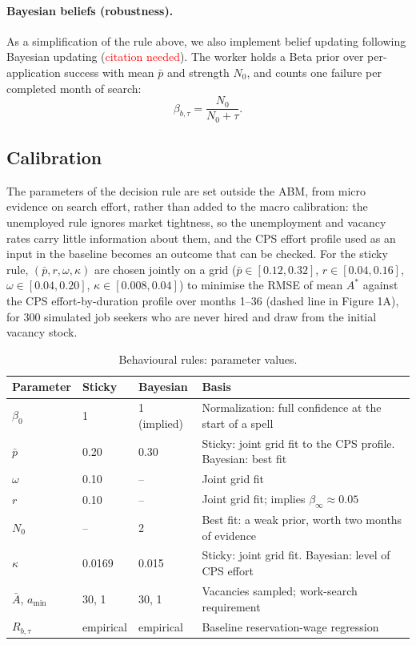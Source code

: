 \documentclass[11pt]{article}
\begin{document}
\paragraph{Bayesian beliefs (robustness).}
As a simplification of the rule above, we also implement belief updating following Bayesian updating (\textcolor{red}{citation needed}). The worker holds a Beta prior over per-application success with mean $\bar p$ and strength $N_0$, and counts one
failure per completed month of search:
\begin{equation}
\beta_{b,\tau} = \frac{N_0}{N_0 + \tau} .
\end{equation}

\subsection{Calibration}\label{sec:cps_cal}

The parameters of the decision rule are set outside the ABM, from micro evidence on search effort, rather than added
to the macro calibration: the unemployed rule ignores market tightness, so the unemployment and vacancy rates carry
little information about them, and the CPS effort profile used as an input in the baseline becomes an outcome that can
be checked. For the sticky rule, $(\bar p, r, \omega, \kappa)$ are chosen jointly on a grid
($\bar p \in [0.12, 0.32]$, $r \in [0.04, 0.16]$, $\omega \in [0.04, 0.20]$, $\kappa \in [0.008, 0.04]$) to minimise
the RMSE of mean $A^*$ against the CPS effort-by-duration profile over months 1--36 (dashed line in Figure 1A), for 300 simulated job seekers who
are never hired and draw from the initial vacancy stock. 

\begin{table}[H]
\centering
\small
\begin{tabularx}{\linewidth}{@{}lllX@{}}
\toprule
Parameter & Sticky & Bayesian & Basis \\
\midrule
$\beta_0$ & 1 & 1 (implied) & Normalization: full confidence at the start of a spell \\
$\bar p$ & 0.20 & 0.30 & Sticky: joint grid fit to the CPS profile. Bayesian: best fit \\
$\omega$ & 0.10 & -- & Joint grid fit \\
$r$ & 0.10 & -- & Joint grid fit; implies $\beta_\infty \approx 0.05$ \\
$N_0$ & -- & 2 & Best fit: a weak prior, worth two months of evidence \\
$\kappa$ & 0.0169 & 0.015 & Sticky: joint grid fit. Bayesian: level of CPS effort \\
$\bar A$, $a_{\min}$ & 30, 1 & 30, 1 & Vacancies sampled; work-search requirement \\
$R_{b,\tau}$ & empirical & empirical & Baseline reservation-wage regression \\
\bottomrule
\end{tabularx}
\caption{Behavioural rules: parameter values.}
\end{table}
\end{document}
